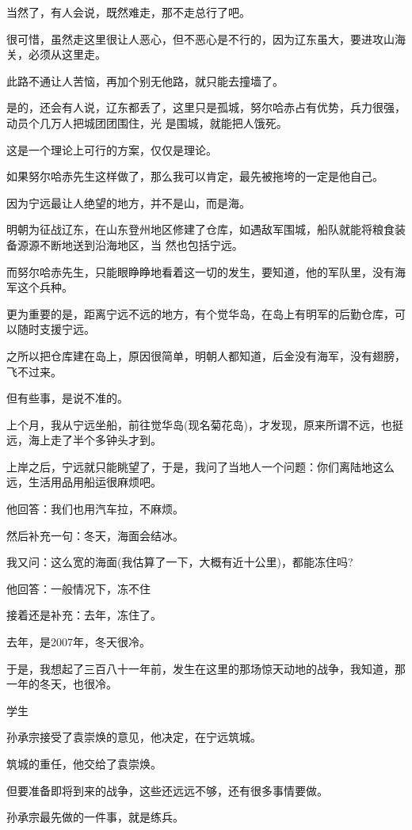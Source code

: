 \documentclass[11pt,a4paper,onecolumn]{article}
\begin{document}
当然了，有人会说，既然难走，那不走总行了吧。

很可惜，虽然走这里很让人恶心，但不恶心是不行的，因为辽东虽大，要进攻山海关，必须从这里走。

此路不通让人苦恼，再加个别无他路，就只能去撞墙了。

是的，还会有人说，辽东都丢了，这里只是孤城，努尔哈赤占有优势，兵力很强，动员个几万人把城团团围住，光
是围城，就能把人饿死。

这是一个理论上可行的方案，仅仅是理论。

如果努尔哈赤先生这样做了，那么我可以肯定，最先被拖垮的一定是他自己。

因为宁远最让人绝望的地方，并不是山，而是海。

明朝为征战辽东，在山东登州地区修建了仓库，如遇敌军围城，船队就能将粮食装备源源不断地送到沿海地区，当
然也包括宁远。

而努尔哈赤先生，只能眼睁睁地看着这一切的发生，要知道，他的军队里，没有海军这个兵种。

更为重要的是，距离宁远不远的地方，有个觉华岛，在岛上有明军的后勤仓库，可以随时支援宁远。

之所以把仓库建在岛上，原因很简单，明朝人都知道，后金没有海军，没有翅膀，飞不过来。

但有些事，是说不准的。

上个月，我从宁远坐船，前往觉华岛(现名菊花岛)，才发现，原来所谓不远，也挺远，海上走了半个多钟头才到。

上岸之后，宁远就只能眺望了，于是，我问了当地人一个问题：你们离陆地这么远，生活用品用船运很麻烦吧。

他回答：我们也用汽车拉，不麻烦。

然后补充一句：冬天，海面会结冰。

我又问：这么宽的海面(我估算了一下，大概有近十公里)，都能冻住吗?

他回答：一般情况下，冻不住

接着还是补充：去年，冻住了。

去年，是2007年，冬天很冷。

于是，我想起了三百八十一年前，发生在这里的那场惊天动地的战争，我知道，那一年的冬天，也很冷。

学生

孙承宗接受了袁崇焕的意见，他决定，在宁远筑城。

筑城的重任，他交给了袁崇焕。

但要准备即将到来的战争，这些还远远不够，还有很多事情要做。

孙承宗最先做的一件事，就是练兵。
\end{document}

